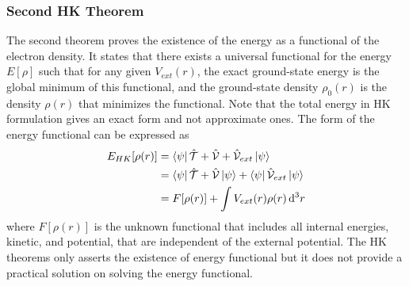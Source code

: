 \subsubsection{Second HK Theorem}
The second theorem proves the existence of the energy as a functional of the electron density. It states that there exists a universal functional for the energy $E[\rho]$ such that for any given $V_{ext}(r)$, the exact ground-state energy is the global minimum of this functional, and the ground-state density $\rho_0(r)$ is the density $\rho(r)$ that minimizes the functional. Note that the total energy in HK formulation gives an exact form and not approximate ones. The form of the energy functional  can be expressed as
\begin{align}
	E_{HK} [\rho(r)] & = \bra{\psi} \hat{\mathcal{T}} + \hat{\mathcal{V}} + \hat{\mathcal{V}}_{ext} \ket{\psi}                        \\
	                 & = \bra{\psi} \hat{\mathcal{T}} + \hat{\mathcal{V}} \ket{\psi}  + \bra{\psi} \hat{\mathcal{V}}_{ext} \ket{\psi} \\
	                 & = F[\rho(r)] + \int V_{ext}(r) \rho(r) \dd[3]{r}
\end{align}
where $F[\rho(r)]$ is the unknown functional that includes all internal energies, kinetic, and potential, that are independent of the external potential. The HK theorems only asserts  the existence of energy functional but it does not provide a practical solution on solving the energy functional.

